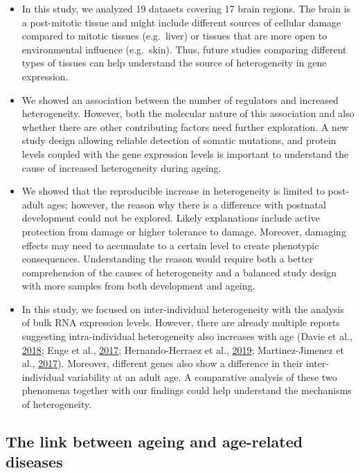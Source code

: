 \documentclass[12pt,twoside]{unicam}
\providecommand{\tightlist}{%
  \setlength{\itemsep}{0pt}\setlength{\parskip}{0pt}}
\begin{document}
\begin{itemize}
\tightlist
\item
  In this study, we analyzed 19 datasets covering 17 brain regions. The brain is a post-mitotic tissue and might include different sources of cellular damage compared to mitotic tissues (e.g.~liver) or tissues that are more open to environmental influence (e.g.~skin). Thus, future studies comparing different types of tissues can help understand the source of heterogeneity in gene expression.
\item
  We showed an association between the number of regulators and increased heterogeneity. However, both the molecular nature of this association and also whether there are other contributing factors need further exploration. A new study design allowing reliable detection of somatic mutations, and protein levels coupled with the gene expression levels is important to understand the cause of increased heterogeneity during ageing.
\item
  We showed that the reproducible increase in heterogeneity is limited to post-adult ages; however, the reason why there is a difference with postnatal development could not be explored. Likely explanations include active protection from damage or higher tolerance to damage. Moreover, damaging effects may need to accumulate to a certain level to create phenotypic consequences. Understanding the reason would require both a better comprehension of the causes of heterogeneity and a balanced study design with more samples from both development and ageing.
\item
  In this study, we focused on inter-individual heterogeneity with the analysis of bulk RNA expression levels. However, there are already multiple reports suggesting intra-individual heterogeneity also increases with age (Davie et al., \protect\hyperlink{ref-Davie2018}{2018}; Enge et al., \protect\hyperlink{ref-Enge2017}{2017}; Hernando-Herraez et al., \protect\hyperlink{ref-Hernando-Herraez2019}{2019}; Martinez-Jimenez et al., \protect\hyperlink{ref-Martinez-Jimenez2017}{2017}). Moreover, different genes also show a difference in their inter-individual variability at an adult age. A comparative analysis of these two phenomena together with our findings could help understand the mechanisms of heterogeneity.
\end{itemize}

\hypertarget{the-link-between-ageing-and-age-related-diseases}{%
\subsection{The link between ageing and age-related diseases}\label{the-link-between-ageing-and-age-related-diseases}}
\end{document}
